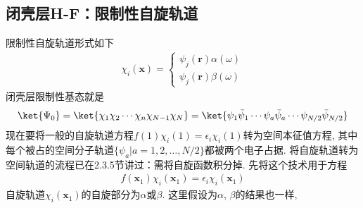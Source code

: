 \subsection{闭壳层H-F：限制性自旋轨道}\label{sec3.4.1}
限制性自旋轨道形式如下
\begin{align}\label{3.110}
	\chi_i(\mathbf{x}) =
	\begin{cases*}
		\psi_j(\mathbf{r})\alpha(\omega)\\
		\psi_j(\mathbf{r})\beta(\omega)
	\end{cases*}
\end{align}
闭壳层限制性基态就是
\begin{align}\label{3.111}
	\ket{\Psi_0} = \ket{\chi_1\chi_2\cdots\chi_n\chi_{N-1}\chi_N} = \ket{\psi_1\bar{\psi}_1\cdots\psi_a\bar{\psi}_a\cdots\psi_{N/2}\bar{\psi}_{N/2}}
\end{align}
现在要将一般的自旋轨道\hft 方程$f(1)\chi_i(1)=\epsilon_i\chi_i(1)$转为空间本征值方程, 
其中每个被占的空间分子轨道$\{\psi_a|a=1,2,\ldots,N/2\}$都被两个电子占据. 
将自旋轨道转为空间轨道的流程已在2.3.5节讲过：需将自旋函数积分掉. 
先将这个技术用于\hft 方程
\begin{align}\label{3.112}
	f(\mathbf{x}_1)\chi_i(\mathbf{x}_1) = \epsilon_i\chi_i(\mathbf{x}_1)
\end{align}
自旋轨道$\chi_i(\mathbf{x}_1)$的自旋部分为$\alpha$或$\beta$. 
这里假设为$\alpha$, 
$\beta$的结果也一样,

